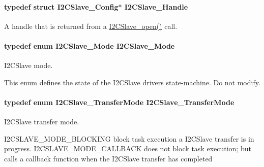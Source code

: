 \paragraph[{I2\+C\+Slave\+\_\+\+Handle}]{\setlength{\rightskip}{0pt plus 5cm}typedef struct {\bf I2\+C\+Slave\+\_\+\+Config}$\ast$ {\bf I2\+C\+Slave\+\_\+\+Handle}}\label{_i2_c_slave_8h_a302d775f802ff66ed2ca05e1956f738e}


A handle that is returned from a \hyperlink{_i2_c_slave_8h_abdfc770ace6accbf91b91f3e195e7119}{I2\+C\+Slave\+\_\+open()} call. 

\paragraph[{I2\+C\+Slave\+\_\+\+Mode}]{\setlength{\rightskip}{0pt plus 5cm}typedef enum {\bf I2\+C\+Slave\+\_\+\+Mode}  {\bf I2\+C\+Slave\+\_\+\+Mode}}\label{_i2_c_slave_8h_aa33e86864be8bf1597048f105b5ef9d0}


I2\+C\+Slave mode. 

This enum defines the state of the I2\+C\+Slave driver\textquotesingle{}s state-\/machine. Do not modify. 
\paragraph[{I2\+C\+Slave\+\_\+\+Transfer\+Mode}]{\setlength{\rightskip}{0pt plus 5cm}typedef enum {\bf I2\+C\+Slave\+\_\+\+Transfer\+Mode}  {\bf I2\+C\+Slave\+\_\+\+Transfer\+Mode}}\label{_i2_c_slave_8h_a788e85749c883393490ad7e49d19b22d}


I2\+C\+Slave transfer mode. 

I2\+C\+S\+L\+A\+V\+E\+\_\+\+M\+O\+D\+E\+\_\+\+B\+L\+O\+C\+K\+I\+N\+G block task execution a I2\+C\+Slave transfer is in progress. I2\+C\+S\+L\+A\+V\+E\+\_\+\+M\+O\+D\+E\+\_\+\+C\+A\+L\+L\+B\+A\+C\+K does not block task execution; but calls a callback function when the I2\+C\+Slave transfer has completed 
